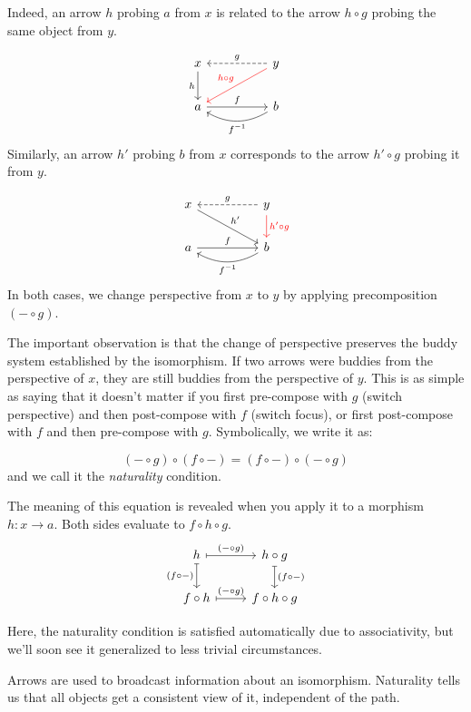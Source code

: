 \documentclass[DaoFP]{subfiles}
\begin{document}
Indeed, an arrow $h$ probing $a$ from $x$ is related to the arrow $h\circ g$ probing the same object from $y$.

\[
 \begin{tikzcd}
 x
 \arrow[d, "h"']
 && y
 \arrow[ll, dashed, "g"']
  \arrow[dll, red, "h \circ g"']
 \\
 a
 \arrow[rr, "f"]
  && b
 \arrow[ll, bend left,  "f^{-1}"]
 \end{tikzcd}
\]
Similarly, an arrow $h'$ probing $b$ from $x$ corresponds to the arrow $h' \circ g$ probing it from $y$. 

\[
 \begin{tikzcd}
 x
 \arrow[drr, "h'"]
 && y
 \arrow[ll, dashed, "g"']
  \arrow[d, red, "h' \circ g"]
 \\
 a
 \arrow[rr, "f"]
  && b
 \arrow[ll, bend left,  "f^{-1}"]
 \end{tikzcd}
\]
In both cases, we change perspective from $x$ to $y$ by applying precomposition $(- \circ g)$.

The important observation is that the change of perspective preserves the buddy system established by the isomorphism. If two arrows were buddies from the perspective of $x$, they are still buddies from the perspective of $y$. This is as simple as saying that it doesn't matter if you first pre-compose with $g$ (switch perspective) and then post-compose with $f$ (switch focus), or first post-compose with $f$ and then pre-compose with $g$. Symbolically, we write it as:

\[(- \circ g) \circ (f \circ -) = (f \circ -) \circ (- \circ g)\]
and we call it the \emph{naturality} condition.


The meaning of this equation is revealed when you apply it to a morphism $h \colon x \to a$. Both sides evaluate to $f \circ h \circ g$.
\[
 \begin{tikzcd}
 h
 \arrow[r, mapsto, "(- \circ g)"]
 \arrow[d, mapsto, "(f \circ -)"']
 & h \circ g
 \arrow[d, mapsto, "(f \circ -)"]
 \\
 f \circ h
 \arrow[r, mapsto, "(- \circ g)"]
& f \circ h \circ g
 \end{tikzcd}
\]

Here, the naturality condition is satisfied automatically due to associativity, but we'll soon see it generalized to less trivial circumstances.


Arrows are used to broadcast information about an isomorphism. Naturality tells us that all objects get a consistent view of it, independent of the path. 
\end{document}
